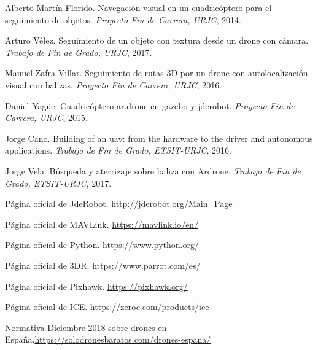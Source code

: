 \begin{thebibliography}{1}


Alberto Martín Florido. Navegación visual en un cuadricóptero para el seguimiento de objetos. 
\textit{Proyecto Fin de Carrera, URJC}, 2014.

Arturo Vélez. Seguimiento de un objeto con textura desde un drone con cámara.
\textit{Trabajo de Fin de Grado, URJC}, 2017.

Manuel Zafra Villar. Seguimiento de rutas 3D por un drone con autolocalización visual con balizas. 
\textit{Proyecto Fin de Carrera, URJC}, 2016.

Daniel Yagüe. Cuadricóptero ar.drone en gazebo y jderobot. 
\textit{Proyecto Fin de Carrera, URJC}, 2015.

Jorge Cano. Building of an uav: from the hardware to the driver and autonomous applications. 
\textit{Trabajo de Fin de Grado, ETSIT-URJC}, 2016.

Jorge Vela. Búsqueda y aterrizaje sobre baliza con Ardrone.
\textit{Trabajo de Fin de Grado, ETSIT-URJC}, 2017.

Página oficial de JdeRobot. \url{http://jderobot.org/Main_Page}

Página oficial de MAVLink. \url{https://mavlink.io/en/}

Página oficial de Python. \url{https://www.python.org/}

Página oficial de 3DR. \url{https://www.parrot.com/es/}

Página oficial de Pixhawk. \url{https://pixhawk.org/}

Página oficial de ICE. \url{https://zeroc.com/products/ice}

Normativa Diciembre 2018 sobre drones en España.\url{https://solodronesbaratos.com/drones-espana/}

\end{thebibliography}